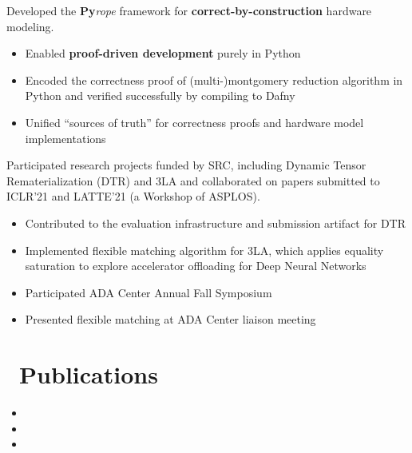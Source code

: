 \documentclass{resume}
\begin{document}
Developed the \textbf{Py}\textit{rope} framework for \textbf{correct-by-construction} hardware modeling.
\begin{itemize}
  \item Enabled \textbf{proof-driven development} purely in Python
  \item Encoded the correctness proof of (multi-)montgomery reduction algorithm in Python and verified successfully by compiling to Dafny
  \item Unified ``sources of truth'' for correctness proofs and hardware model implementations
\end{itemize}

Participated research projects funded by SRC, including Dynamic Tensor Rematerialization (DTR) and 3LA and collaborated on papers submitted to ICLR'21 and LATTE'21 (a Workshop of ASPLOS). 
\begin{itemize}
    \item Contributed to the evaluation infrastructure and submission artifact for DTR
    \item Implemented flexible matching algorithm for 3LA, which applies equality saturation to explore accelerator offloading for Deep Neural Networks
    \item Participated ADA Center Annual Fall Symposium
    \item Presented flexible matching at ADA Center liaison meeting
\end{itemize}

\section{\faLeanpub\ Publications}
\begin{itemize}
    \item {}
    \item {}
    \item {}
\end{itemize}
\end{document}
